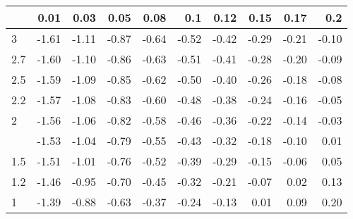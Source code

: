 
\begin{tabular}{lrrrrrrrrr}
\toprule
  & 0.01 & 0.03 & 0.05 & 0.08 & 0.1 & 0.12 & 0.15 & 0.17 & 0.2\\
\midrule
3 & -1.61 & -1.11 & -0.87 & -0.64 & -0.52 & -0.42 & -0.29 & -0.21 & -0.10\\
2.7 & -1.60 & -1.10 & -0.86 & -0.63 & -0.51 & -0.41 & -0.28 & -0.20 & -0.09\\
2.5 & -1.59 & -1.09 & -0.85 & -0.62 & -0.50 & -0.40 & -0.26 & -0.18 & -0.08\\
2.2 & -1.57 & -1.08 & -0.83 & -0.60 & -0.48 & -0.38 & -0.24 & -0.16 & -0.05\\
2 & -1.56 & -1.06 & -0.82 & -0.58 & -0.46 & -0.36 & -0.22 & -0.14 & -0.03\\
\addlinespace
1.7 & -1.53 & -1.04 & -0.79 & -0.55 & -0.43 & -0.32 & -0.18 & -0.10 & 0.01\\
1.5 & -1.51 & -1.01 & -0.76 & -0.52 & -0.39 & -0.29 & -0.15 & -0.06 & 0.05\\
1.2 & -1.46 & -0.95 & -0.70 & -0.45 & -0.32 & -0.21 & -0.07 & 0.02 & 0.13\\
1 & -1.39 & -0.88 & -0.63 & -0.37 & -0.24 & -0.13 & 0.01 & 0.09 & 0.20\\
\bottomrule
\end{tabular}
